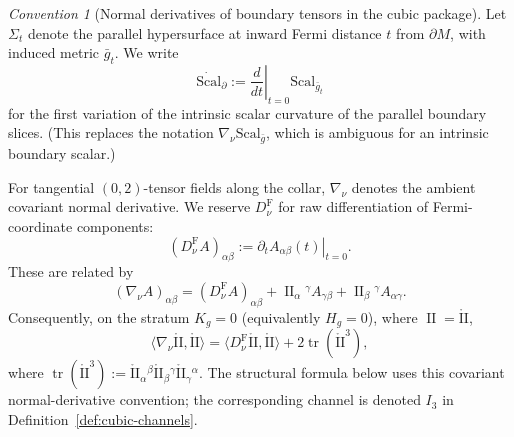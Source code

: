 \documentclass[11pt,reqno,a4paper]{amsart}
\DeclareMathOperator{\II}{II}
\numberwithin{equation}{section}
\theoremstyle{plain}
\newcommand{\Scal}{\mathrm{Scal}}
\theoremstyle{remark}
\newtheorem{convention}[theorem]{Convention}
\theoremstyle{plain}
\begin{document}
\begin{convention}[Normal derivatives of boundary tensors in the cubic package]
\label{conv:normal-derivatives-cubic}
Let $\Sigma_t$ denote the parallel hypersurface at inward Fermi distance $t$
from $\partial M$, with induced metric $\bar g_t$.  We write
\[
\dot{\Scal}_\partial
:=
\left.\frac{d}{dt}\right|_{t=0}\Scal_{\bar g_t}
\]
for the first variation of the intrinsic scalar curvature of the parallel
boundary slices.  (This replaces the notation $\nabla_\nu\Scal_{\bar g}$,
which is ambiguous for an intrinsic boundary scalar.)

For tangential $(0,2)$-tensor fields along the collar, $\nabla_\nu$ denotes
the ambient covariant normal derivative.  We reserve $D_\nu^{\mathrm F}$ for
raw differentiation of Fermi-coordinate components:
\[
(D_\nu^{\mathrm F}A)_{\alpha\beta}
:=
\left.\partial_t A_{\alpha\beta}(t)\right|_{t=0}.
\]
These are related by
\[
(\nabla_\nu A)_{\alpha\beta}
=
(D_\nu^{\mathrm F}A)_{\alpha\beta}
+
\II_\alpha{}^\gamma A_{\gamma\beta}
+
\II_\beta{}^\gamma A_{\alpha\gamma}.
\]
Consequently, on the stratum $K_g=0$ (equivalently $H_g=0$), where
$\II=\mathring{\mathrm{II}}$,
\begin{equation}\label{eq:covariant-vs-fermi-II}
\langle\nabla_\nu\mathring{\mathrm{II}},\mathring{\mathrm{II}}\rangle
=
\langle D_\nu^{\mathrm F}\mathring{\mathrm{II}},\mathring{\mathrm{II}}\rangle
+
2\operatorname{tr}(\mathring{\mathrm{II}}^3),
\end{equation}
where $\operatorname{tr}(\mathring{\mathrm{II}}^3)
:=\mathring{\mathrm{II}}_\alpha{}^\beta
\mathring{\mathrm{II}}_\beta{}^\gamma
\mathring{\mathrm{II}}_\gamma{}^\alpha$.
The structural formula below uses this covariant normal-derivative convention;
the corresponding channel is denoted $I_3$ in
Definition~\ref{def:cubic-channels}.
\end{convention}
\end{document}
